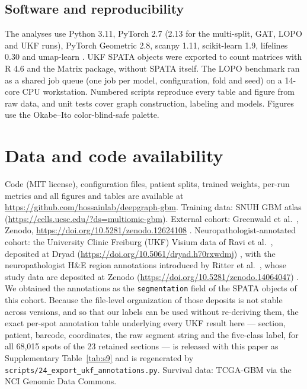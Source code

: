 \documentclass[11pt,letterpaper]{article}
\begin{document}
\subsection{Software and reproducibility}

The analyses use Python 3.11, PyTorch 2.7 (2.13 for the multi-split, GAT, LOPO and UKF runs), PyTorch Geometric 2.8, scanpy 1.11, scikit-learn 1.9, lifelines 0.30 and umap-learn \cite{mcinnes2018}. UKF SPATA objects were exported to count matrices with R 4.6 and the Matrix package, without SPATA itself. The LOPO benchmark ran as a shared job queue (one job per model, configuration, fold and seed) on a 14-core CPU workstation. Numbered scripts reproduce every table and figure from raw data, and unit tests cover graph construction, labeling and models. Figures use the Okabe--Ito color-blind-safe palette.

\section*{Data and code availability}
Code (MIT license), configuration files, patient splits, trained weights, per-run metrics and all figures and tables are available at \url{https://github.com/hossainlab/deepgraph-gbm}. Training data: SNUH GBM atlas \cite{park2026} (\url{https://cells.ucsc.edu/?ds=multiomic-gbm}). External cohort: Greenwald et al.\ \cite{greenwald2024}, Zenodo, \url{https://doi.org/10.5281/zenodo.12624108} \cite{greenwald2024data}. Neuropathologist-annotated cohort: the University Clinic Freiburg (UKF) Visium data of Ravi et al.\ \cite{ravi2022}, deposited at Dryad (\url{https://doi.org/10.5061/dryad.h70rxwdmj}) \cite{ravi2022data}, with the neuropathologist H\&E region annotations introduced by Ritter et al.\ \cite{ritter2025}, whose study data are deposited at Zenodo (\url{https://doi.org/10.5281/zenodo.14064047}) \cite{heiland2024data}. We obtained the annotations as the \texttt{segmentation} field of the SPATA objects of this cohort. Because the file-level organization of those deposits is not stable across versions, and so that our labels can be used without re-deriving them, the exact per-spot annotation table underlying every UKF result here --- section, patient, barcode, coordinates, the raw segment string and the five-class label, for all 68{,}015 spots of the 23 retained sections --- is released with this paper as Supplementary Table~\ref{tab:s9} and is regenerated by \texttt{scripts/24\_export\_ukf\_annotations.py}. Survival data: TCGA-GBM via the NCI Genomic Data Commons.
\end{document}
